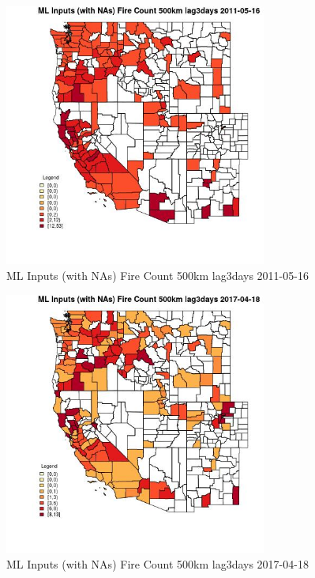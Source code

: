 \begin{figure} 
\centering  
\includegraphics[width=0.77\textwidth]{Code_Outputs/Report_ML_input_PM25_Step4_part_e_de_duplicated_aves_compiled_2019-05-21wNAs_CountyFire_Count_500km_lag3daysMean2011-05-16.jpg} 
\caption{\label{fig:Report_ML_input_PM25_Step4_part_e_de_duplicated_aves_compiled_2019-05-21wNAsCountyFire_Count_500km_lag3daysMean2011-05-16}ML Inputs (with NAs) Fire Count 500km lag3days 2011-05-16} 
\end{figure} 
 

\begin{figure} 
\centering  
\includegraphics[width=0.77\textwidth]{Code_Outputs/Report_ML_input_PM25_Step4_part_e_de_duplicated_aves_compiled_2019-05-21wNAs_CountyFire_Count_500km_lag3daysMean2017-04-18.jpg} 
\caption{\label{fig:Report_ML_input_PM25_Step4_part_e_de_duplicated_aves_compiled_2019-05-21wNAsCountyFire_Count_500km_lag3daysMean2017-04-18}ML Inputs (with NAs) Fire Count 500km lag3days 2017-04-18} 
\end{figure} 
 

